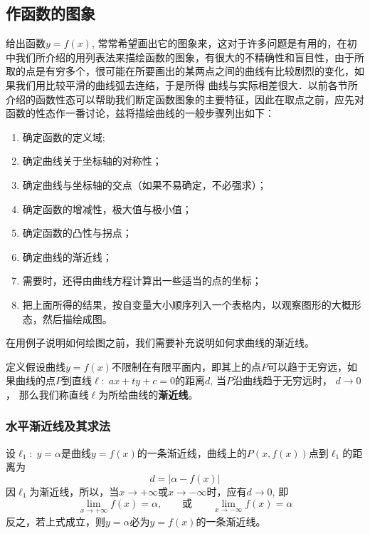     \subsection{作函数的图象}
    给出函数$y=f(x)$, 常常希望画出它的图象来，这对于许多问题是有用的，在初中我们所介绍的用列表法来描绘函数的图象，有很大的不精确性和盲目性，由于所取的点是有穷多个，很可能在所要画出的某两点之间的曲线有比较剧烈的变化，如果我们用比较平滑的曲线弧去连结，于是所得
    曲线与实际相差很大．以前各节所介绍的函数性态可以帮助我们断定函数图象的主要特征，因此在取点之前，应先对函数的性态作一番讨论，兹将描绘曲线的一般步骤列出如下：
    
    \begin{enumerate}
    \item 确定函数的定义域;
    \item 确定曲线关于坐标轴的对称性；
    \item 确定曲线与坐标轴的交点（如果不易确定，不必强求）；
    \item 确定函数的增减性，极大值与极小值；
    \item 确定函数的凸性与拐点；
    \item 确定曲线的渐近线；
    \item 需要时，还得由曲线方程计算出一些适当的点的坐标；
    \item 把上面所得的结果，按自变量大小顺序列入一个表格内，以观察图形的大概形态，然后描绘成图。
    \end{enumerate}
    
    在用例子说明如何绘图之前，我们需要补充说明如何求曲线的渐近线。
    
    \begin{blk}
        {定义}假设曲线$y=f(x)$不限制在有限平面内，即其上的点$P$可以趋于无穷远，如果曲线的点$P$到直线$\ell:\; ax+ty+c=0$的距离$d$, 当$P$沿曲线趋于无穷远时，
        $d\to 0$，
        那么我们称直线$\ell$为所给曲线的\textbf{渐近线}。
    \end{blk}
    
    \subsubsection{水平渐近线及其求法}
    
    设$\ell_1:\; y=\alpha$是曲线$y=f(x)$的一条渐近线，曲线上的$P(x,f(x))$点到$\ell_1$的距离为
    \[d=|\alpha-f(x)|\]
    因$\ell_1$为渐近线，所以，当$x\to +\infty$或$x\to -\infty$时，应有$d\to 0$, 即
    \[\lim_{x\to+\infty}f(x)=\alpha,\qquad \text{或}\qquad \lim_{x\to -\infty}f(x)=\alpha\]
    反之，若上式成立，则$y=\alpha$必为$y=f(x)$的一条渐近线。
    

